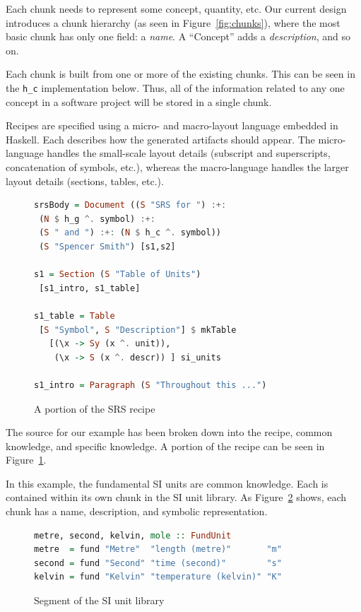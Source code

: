 \documentclass{sig-alternate-05-2015}
\begin{document}
Each chunk needs to represent some concept, quantity, etc. Our current design
introduces a chunk hierarchy (as seen in Figure~\ref{fig:chunks}), where the
most basic chunk has only one field: a \textit{name}. A ``Concept'' adds a
\textit{description}, and so on.

Each chunk is built from one or more of the existing chunks. This can be seen in
the \verb|h_c| implementation below. Thus, all of the information related to any
one concept in a software project will be stored in a single chunk.

Recipes are specified using a micro- and macro-layout language embedded in
Haskell. Each describes how the generated artifacts should appear.  The
micro-language handles the small-scale layout details (subscript and
superscripts, concatenation of symbols, etc.), whereas the macro-language
handles the larger layout details (sections, tables, etc.).

\begin{figure}[tb]
\begin{lstlisting}[language=Haskell, frame=single, 
  showstringspaces=false, basicstyle=\scriptsize]
srsBody = Document ((S "SRS for ") :+: 
 (N $ h_g ^. symbol) :+: 
 (S " and ") :+: (N $ h_c ^. symbol)) 
 (S "Spencer Smith") [s1,s2]

s1 = Section (S "Table of Units") 
 [s1_intro, s1_table]

s1_table = Table 
 [S "Symbol", S "Description"] $ mkTable
   [(\x -> Sy (x ^. unit)),
    (\x -> S (x ^. descr)) ] si_units

s1_intro = Paragraph (S "Throughout this ...")
\end{lstlisting}
\caption{A portion of the SRS recipe}
\label{fig:recipe}
\end{figure}

The source for our example has been broken down into the recipe, common
knowledge, and specific knowledge. A portion of the recipe can be seen in
Figure~\ref{fig:recipe}.

In this example, the fundamental SI units are common knowledge. Each is
contained within its own chunk in the SI unit library. As
Figure~\ref{fig:know_common} shows, each chunk has a name, description, and
symbolic representation.

\begin{figure}[thb]
\begin{lstlisting}[language=Haskell, frame=single, showstringspaces=false, 
  basicstyle=\scriptsize]
metre, second, kelvin, mole :: FundUnit
metre  = fund "Metre"  "length (metre)"       "m"
second = fund "Second" "time (second)"        "s"
kelvin = fund "Kelvin" "temperature (kelvin)" "K"
\end{lstlisting}
\caption{Segment of the SI unit library}
\label{fig:know_common}
\end{figure}
\end{document}
